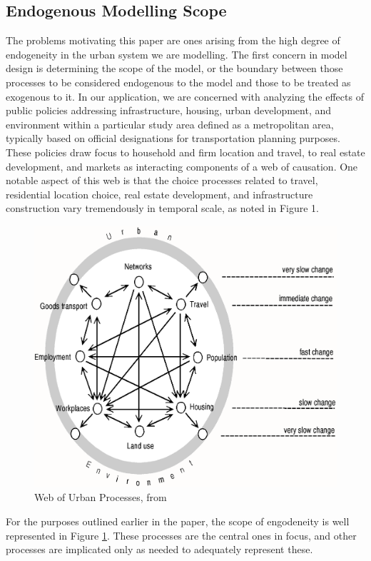 \documentclass[12pt,a4paper]{article}
\begin{document}
\subsection{Endogenous Modelling Scope}

The problems motivating this paper are ones arising from the high
degree of endogeneity in the urban system we are modelling. The
first concern in model design is determining the scope of the
model, or the boundary between those processes to be considered
endogenous to the model and those to be treated as exogenous to
it.  In our application, we are concerned with analyzing the
effects of public policies addressing infrastructure, housing,
urban development, and environment within a particular study area
defined as a metropolitan area, typically based on official
designations for transportation planning purposes. These policies
draw focus to household and firm location and travel, to real
estate development, and markets as interacting components of a web
of causation.  One notable aspect of this web is that the choice
processes related to travel, residential location choice, real
estate development, and infrastructure construction vary
tremendously in temporal scale, as noted in Figure 1.

\begin{figure}[h]
\center
 \includegraphics[width=4.5in]
 {wegener.png}
\caption{Web of Urban Processes, from \cite{wegener-1994}}
\label{fig:wegener}
\end{figure}

For the purposes outlined earlier in the paper, the scope of
engodeneity is well represented in Figure \ref{fig:wegener}. These
processes are the central ones in focus, and other processes are
implicated only as needed to adequately represent these.
\end{document}
